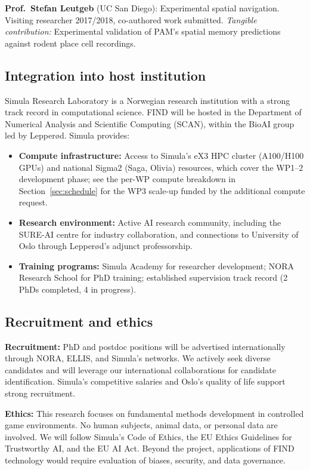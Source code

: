 \noindent\textbf{Prof.\ Stefan Leutgeb} (UC San Diego): Experimental spatial navigation. Visiting researcher 2017/2018, co-authored work submitted. \textit{Tangible contribution:} Experimental validation of PAM's spatial memory predictions against rodent place cell recordings.

\subsection{Integration into host institution}

Simula Research Laboratory is a Norwegian research institution with a strong track record in computational science. FIND will be hosted in the Department of Numerical Analysis and Scientific Computing (SCAN), within the BioAI group led by Lepperød. Simula provides:
\begin{itemize}[noitemsep,topsep=2pt]
  \item \textbf{Compute infrastructure:} Access to Simula's eX3 HPC cluster (A100/H100 GPUs) and national Sigma2 (Saga, Olivia) resources, which cover the WP1--2 development phase; see the per-WP compute breakdown in Section~\ref{sec:schedule} for the WP3 scale-up funded by the additional compute request.
  \item \textbf{Research environment:} Active AI research community, including the SURE-AI centre for industry collaboration, and connections to University of Oslo through Lepperød's adjunct professorship.
  \item \textbf{Training programs:} Simula Academy for researcher development; NORA Research School for PhD training; established supervision track record (2 PhDs completed, 4 in progress).
\end{itemize}

\subsection{Recruitment and ethics}

\noindent\textbf{Recruitment:} PhD and postdoc positions will be advertised internationally through NORA, ELLIS, and Simula's networks. We actively seek diverse candidates and will leverage our international collaborations for candidate identification. Simula's competitive salaries and Oslo's quality of life support strong recruitment.

\noindent\textbf{Ethics:} This research focuses on fundamental methods development in controlled game environments. No human subjects, animal data, or personal data are involved. We will follow Simula's Code of Ethics, the EU Ethics Guidelines for Trustworthy AI, and the EU AI Act. Beyond the project, applications of FIND technology would require evaluation of biases, security, and data governance.

